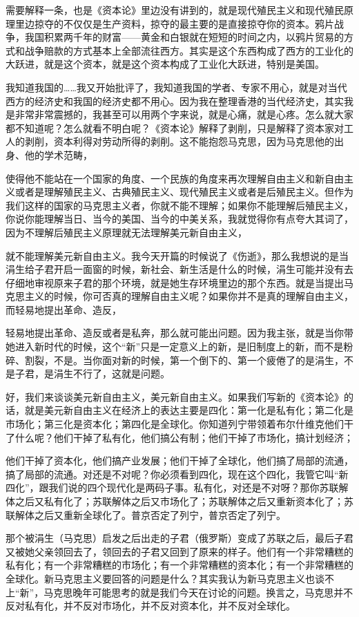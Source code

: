 \documentclass[UTF8, 12pt, a4paper]{ctexrep}
\begin{document}
需要解释一条，也是《资本论》里边没有讲到的，就是现代殖民主义和现代殖民原理里边掠夺的不仅仅是生产资料，掠夺的最主要的是直接掠夺你的资本。鸦片战争，我国积累两千年的财富——黄金和白银就在短短的时间之内，以鸦片贸易的方式和战争赔款的方式基本上全部流往西方。其实是这个东西构成了西方的工业化的大跃进，就是这个资本，就是这个资本构成了工业化大跃进，特别是美国。

我知道我国的……我又开始批评了，我知道我国的学者、专家不用心，就是对当代西方的经济史和我国的经济史都不用心。因为我在整理香港的当代经济史，其实我是非常非常震撼的，我甚至可以用两个字来说，就是心痛，就是心疼。怎么就大家都不知道呢？怎么就看不明白呢？《资本论》解释了剥削，只是解释了资本家对工人的剥削，资本利得对劳动所得的剥削。这不能抱怨马克思，因为马克思他的出身、他的学术范畴，

使得他不能站在一个国家的角度、一个民族的角度来再次理解自由主义和新自由主义或者是理解殖民主义、古典殖民主义、现代殖民主义或者是后殖民主义。但作为我们这样的国家的马克思主义者，你就不能不理解；如果你不能理解后殖民主义，你说你能理解当日、当今的美国、当今的中美关系，我就觉得你有点夸大其词了，因为不理解后殖民主义原理就无法理解美元新自由主义，

就不能理解美元新自由主义。我今天开篇的时候说了《伤逝》，那么我想说的是当涓生给子君开启一面窗的时候，新社会、新生活是什么的时候，涓生可能并没有去仔细地审视原来子君的那个环境，就是她生存环境里边的那个东西。就是当提出马克思主义的时候，你可否真的理解自由主义呢？如果你并不是真的理解自由主义，而轻易地提出革命、造反，

轻易地提出革命、造反或者是私奔，那么就可能出问题。因为我主张，就是当你带她进入新时代的时候，这个“新”只是一定意义上的新，是旧制度上的新，而不是粉碎、割裂，不是。当你面对新的时候，第一个倒下的、第一个疲倦了的是涓生，不是子君，是涓生不行了，这就是问题。

好，我们来谈谈美元新自由主义，美元新自由主义。如果我们写新的《资本论》的话，就是美元新自由主义在经济上的表达主要是四化：第一化是私有化；第二化是市场化；第三化是资本化；第四化是全球化。你知道列宁带领着布尔什维克他们干了什么呢？他们干掉了私有化，他们搞公有制；他们干掉了市场化，搞计划经济；

他们干掉了资本化，他们搞产业发展；他们干掉了全球化，他们搞了局部的流通，搞了局部的流通。对还是不对呢？你必须看到四化，现在这个四化，我管它叫“新四化”，跟我们说的四个现代化是两码子事。私有化，对还是不对呀？那你苏联解体之后又私有化了；苏联解体之后又市场化了；苏联解体之后又重新资本化了；苏联解体之后又重新全球化了。普京否定了列宁，普京否定了列宁。

那个被涓生（马克思）启发之后出走的子君（俄罗斯）变成了苏联之后，最后子君又被她父亲领回去了，领回去的子君又回到了原来的样子。他们有一个非常糟糕的私有化；有一个非常糟糕的市场化；有一个非常糟糕的资本化；有一个非常糟糕的全球化。新马克思主义要回答的问题是什么？其实我认为新马克思主义也谈不上“新”，马克思晚年可能思考的就是我们今天在讨论的问题。换言之，马克思并不反对私有化，并不反对市场化，并不反对资本化，并不反对全球化。
\end{document}
